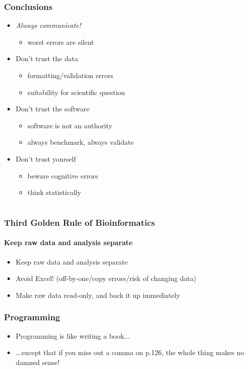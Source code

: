 \documentclass[table]{beamer}
\begin{document}
  \begin{frame}
    \frametitle{Conclusions}
	\begin{itemize}
	  \item \emph{Always communicate!}
	    \begin{itemize}
	      \item worst errors are silent
	    \end{itemize}	  
	  \item Don't trust the data
	    \begin{itemize}
	      \item formatting/validation errors
	      \item suitability for scientific question
	    \end{itemize}
	  \item Don't trust the software
	    \begin{itemize}
	      \item software is not an authority
	      \item always benchmark, always validate
	    \end{itemize}
	  \item Don't trust yourself
	    \begin{itemize}
	      \item beware cognitive errors
	      \item think statistically
	    \end{itemize}	  
	\end{itemize}
  \end{frame}

  \section{}

  \begin{frame}
    \frametitle{Third Golden Rule of Bioinformatics}
    \framesubtitle{Keep raw data and analysis separate}
	\begin{itemize}
	  \item Keep raw data and analysis separate
	  \item Avoid Excel! (off-by-one/copy errors/risk of changing data)
	  \item Make raw data read-only, and back it up immediately
	\end{itemize}
  \end{frame}


  \begin{frame}
    \frametitle{Programming}
	\begin{itemize}
	  \item Programming is like writing a book$\ldots$
	  \item $\ldots$except that if you miss out a comma on p.126, the whole thing makes no damned sense!
	\end{itemize}
  \end{frame}
\end{document}
